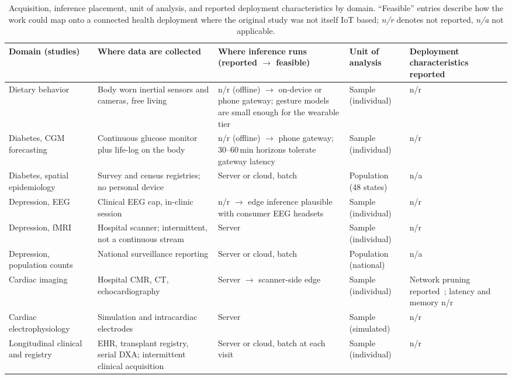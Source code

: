 \documentclass[journal]{IEEEtran}
\newif\ifsubmission
\begin{document}
\ifsubmission\else
\begin{table}[t]
\centering
\caption{Acquisition, inference placement, unit of analysis, and reported deployment characteristics by domain. ``Feasible'' entries describe how the work could map onto a connected health deployment where the original study was not itself IoT based; \emph{n/r} denotes not reported, \emph{n/a} not applicable.}
\label{tab:iot-placement}
\scriptsize
\setlength{\tabcolsep}{3.5pt}
\renewcommand{\arraystretch}{1.15}
\begin{tabularx}{\textwidth}{>{\raggedright\arraybackslash}p{2.3cm} >{\raggedright\arraybackslash}p{3.1cm} >{\raggedright\arraybackslash}X >{\raggedright\arraybackslash}p{1.9cm} >{\raggedright\arraybackslash}p{2.9cm}}
\toprule
\textbf{Domain (studies)} & \textbf{Where data are collected} & \textbf{Where inference runs (reported $\rightarrow$ feasible)} & \textbf{Unit of analysis} & \textbf{Deployment characteristics reported} \\
\midrule
Dietary behavior~\cite{Rouast2020IntakeGesture,Kyritsis2019EatingBehavior} & Body worn inertial sensors and cameras, free living & n/r (offline) $\rightarrow$ on-device or phone gateway; gesture models are small enough for the wearable tier & Sample (individual) & n/r \\
\addlinespace[2pt]
Diabetes, CGM forecasting~\cite{Li2020GluNet,Lim2025VirtualCGM} & Continuous glucose monitor plus life-log on the body & n/r (offline) $\rightarrow$ phone gateway; 30--60\,min horizons tolerate gateway latency & Sample (individual) & n/r \\
\addlinespace[2pt]
Diabetes, spatial epidemiology~\cite{XiaoLi2016DiabetesSpatiotemporal} & Survey and census registries; no personal device & Server or cloud, batch & Population (48 states) & n/a \\
\addlinespace[2pt]
Depression, EEG~\cite{2} & Clinical EEG cap, in-clinic session & n/r $\rightarrow$ edge inference plausible with consumer EEG headsets & Sample (individual) & n/r \\
\addlinespace[2pt]
Depression, fMRI~\cite{4,9} & Hospital scanner; intermittent, not a continuous stream & Server & Sample (individual) & n/r \\
\addlinespace[2pt]
Depression, population counts~\cite{3} & National surveillance reporting & Server or cloud, batch & Population (national) & n/a \\
\addlinespace[2pt]
Cardiac imaging~\cite{5,6} & Hospital CMR, CT, echocardiography & Server $\rightarrow$ scanner-side edge & Sample (individual) & Network pruning reported~\cite{5}; latency and memory n/r \\
\addlinespace[2pt]
Cardiac electrophysiology~\cite{7} & Simulation and intracardiac electrodes & Server & Sample (simulated) & n/r \\
\addlinespace[2pt]
Longitudinal clinical and registry~\cite{lin2022deep,nitski2021long,glaser2022deep} & EHR, transplant registry, serial DXA; intermittent clinical acquisition & Server or cloud, batch at each visit & Sample (individual) & n/r \\
\bottomrule
\end{tabularx}
\end{table}
\fi
\end{document}
